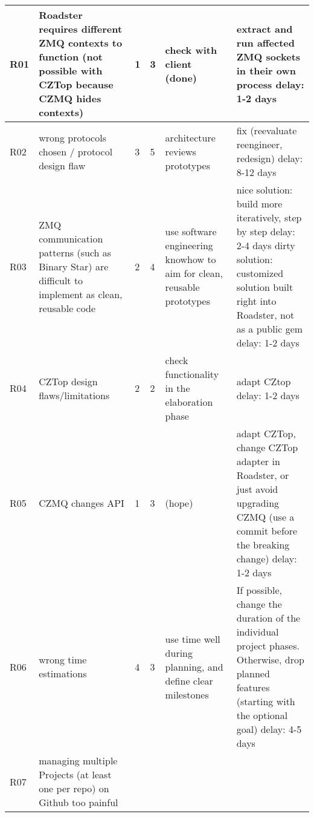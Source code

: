 \begin{center}
\begin{longtable}{|p{6mm}|p{30mm}|p{6mm}|p{8mm}|p{30mm}|p{64mm}|}
    \hline
    \endlastfoot
    R01
		& Roadster requires different ZMQ contexts to function (not possible with CZTop because CZMQ hides contexts)
		& \cellcolor{green!50}1
		& \cellcolor{green!50}3
		& check with client	(done)
		& extract and run affected ZMQ \newline sockets in their own process \newline delay: 1-2 days \\ \hline
	R02
		& wrong protocols chosen / protocol design flaw
		& \cellcolor{orange!50}3
		& \cellcolor{orange!50}5
		& architecture \newline reviews prototypes
		& fix (reevaluate reengineer, redesign) \newline delay: 8-12 days	\\ \hline
	R03
		& ZMQ communication patterns (such as Binary Star) are difficult to implement as clean, reusable code
		& \cellcolor{yellow!50}2
		& \cellcolor{yellow!50}4
		& use software engineering knowhow to aim for clean, reusable prototypes
		& nice solution: \newline build more iteratively, step by step \newline delay: 2-4 days \newline \newline dirty solution:
		\newline customized solution built right into Roadster, not as a public gem \newline delay: 1-2 days \\ \hline
	R04
		& CZTop design flaws/limitations
		& \cellcolor{green!50}2
		& \cellcolor{green!50}2
		& check functionality in the elaboration phase
		& adapt CZtop \newline delay: 1-2 days \\ \hline
	R05
		& CZMQ changes API
		& \cellcolor{green!50}1
		& \cellcolor{green!50}3
		& (hope)
		& adapt CZTop, change CZTop adapter in Roadster, or just avoid upgrading CZMQ (use a commit before the breaking change) \newline delay: 1-2 days \\ \hline
	R06
		& wrong time estimations
		& \cellcolor{yellow!50}4
		& \cellcolor{yellow!50}3
		& use time well during planning, and define clear milestones
		& If possible, change the duration of the individual project phases. Otherwise, drop planned features
		(starting with the optional goal) \newline delay: 4-5 days \\ \hline
	R07
		& managing multiple Projects (at least one per repo) on Github too painful

\end{longtable}
\end{center}
